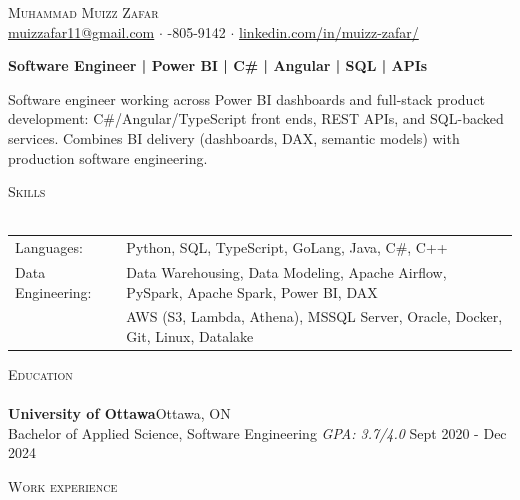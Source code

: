 \documentclass[a4paper]{article}
\newcommand{\lineunder} {
    \vspace*{-8pt} \\
    \hspace*{-18pt} \hrulefill \\
}
\newcommand{\header} [1] {
    {\hspace*{-18pt}\vspace*{6pt} \textsc{#1}}
    \vspace*{-6pt} \lineunder
}
\begin{document}
\vspace*{-40pt}

\vspace*{-10pt}
\begin{center}
	{\Huge \scshape {Muhammad Muizz Zafar}}\\
	\faSend \space \href{mailto:muizzafar11@gmail.com}{muizzafar11@gmail.com} $\cdot$ \faPhoneSquare {}-805-9142 $\cdot$ \faLinkedinSquare \space \href{https://www.linkedin.com/in/muizz-zafar/}{linkedin.com/in/muizz-zafar/}
	\\
\end{center}

\vspace{-5pt}
\begin{center}
\textbf{Software Engineer | Power BI | C\# | Angular | SQL | APIs}
\end{center}
\begin{center}
Software engineer working across Power BI dashboards and full-stack product development: C\#/Angular/TypeScript front ends, REST APIs, and SQL-backed services. Combines BI delivery (dashboards, DAX, semantic models) with production software engineering.
\end{center}

\header{Skills}
\begin{tabular}{ l l }
	Languages: 
& Python, SQL, TypeScript, GoLang, Java, C\#, C++ \\

Data Engineering: 
& Data Warehousing, Data Modeling, Apache Airflow, PySpark, Apache Spark, Power BI, DAX\\
& AWS (S3, Lambda, Athena), MSSQL Server, Oracle, Docker, Git, Linux, Datalake

\end{tabular}

\header{Education}
\textbf{University of Ottawa}\hfill Ottawa, ON\\
Bachelor of Applied Science, Software Engineering \textit{GPA: 3.7/4.0} \hfill Sept 2020 - Dec 2024\\
\vspace{2mm}

\header{Work experience}
\vspace{1.5mm}
\end{document}
